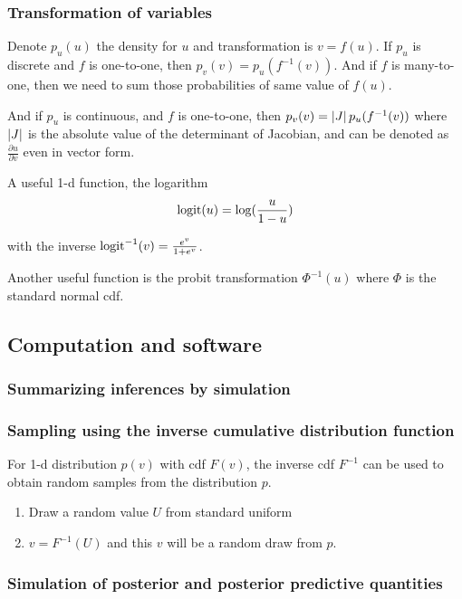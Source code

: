 \documentclass[11pt,a4paper]{article}
\begin{document}
\subsubsection*{Transformation of variables}
Denote \(p_u(u)\) the density for \(u\) and transformation is \(v=f(u)\). If \(p_u\) is discrete and \(f\) is one-to-one, then \(p_v(v)=p_u(f^{-1}(v))\). And if \(f\) is many-to-one, then we need to sum those probabilities of same value of \(f(u)\).

And if \(p_u\) is continuous, and \(f\) is one-to-one, then \(p_v(v)=\left\vert J\right\vert p_u(f^{-1}(v))\) where \(\left\vert J\right\vert\) is the absolute value of the determinant of Jacobian, and can be denoted as \(\frac{\partial u}{\partial v}\) even in vector form.

A useful 1-d function, the logarithm
\begin{equation}\label{1.10}
    \operatorname{logit}(u)=\log(\frac{u}{1-u})
\end{equation}

with the inverse \(\operatorname{logit}^{-1}(v)=\frac{e^v}{1+e^v}\).

Another useful function is the probit transformation \(\Phi^{-1}(u)\) where \(\Phi\) is the standard normal cdf.

\subsection{Computation and software}
\subsubsection*{Summarizing inferences by simulation}
\subsubsection*{Sampling using the inverse cumulative distribution function}

For 1-d distribution \(p(v)\) with cdf \(F(v)\), the inverse cdf \(F^{-1}\) can be used to obtain random samples from the distribution \(p\).

\begin{enumerate}
    \item Draw a random value \(U\) from standard uniform
    \item \(v=F^{-1}(U)\) and this \(v\) will be a random draw from \(p\).
\end{enumerate}

\subsubsection*{Simulation of posterior and posterior predictive quantities}
\end{document}
